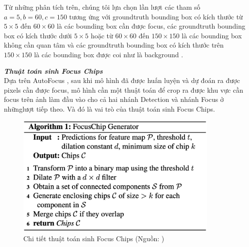 {    \noindent
    Từ những phân tích trên, chúng tôi lựa chọn lần lượt các tham số $a = 5, b = 60, c = 150$ tương ứng với groundtruth  bounding box  có kích thước từ $5 \times 5$ đến $60 \times 60$ là các bounding box  cần được focus, các groundtruth  bounding box  có kích thước dưới $5 \times 5$ hoặc từ $60 \times 60$ đến $150 \times 150$ là các bounding box  không cần quan tâm và các groundtruth  bounding box  có kích thước trên $150 \times 150$ là các bounding box  được coi như là background .

    \noindent
    \textbf{\textit{Thuật toán sinh Focus Chips}} \\
    Dựa trên AutoFocus \cite{najibi2019autofocus}, sau khi mô hình đã được huấn luyện và dự đoán ra được pixels  cần được focus, mô hình cần một thuật toán để crop ra được khu vực cần focus trên ảnh làm đầu vào cho cả hai nhánh Detection  và nhánh Focus  ở nhữnglượt tiếp theo.
    Và đó là vai trò của thuật toán sinh Focus Chips.

    \begin{figure}[H]
        \centering
        \includegraphics[width=10cm] {images/autofocus_focus_chip_gen}
        \caption{Chi tiết thuật toán sinh Focus Chips (Nguồn: \cite{najibi2019autofocus})}
        \label{fig:autofocus_focus_chip_gen}
    \end{figure}

}
